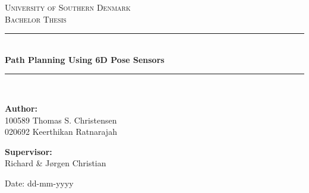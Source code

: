 \begin{titlepage}
\begin{center}

\textsc{\LARGE University of Southern Denmark}\\[1.5cm]
\textsc{\Large Bachelor Thesis}\\[0.5cm]
\vfill
\hrule ~\\[0.3cm]
{ \huge \bfseries Path Planning Using 6D Pose Sensors\\[0.4cm] }
\hrule ~\\[1.5cm]
\vfill

\begin{minipage}[t]{7.9cm}
\begin{flushleft} \large
\textbf{Author:}\\
100589 Thomas S. Christensen \\
020692 Keerthikan Ratnarajah\\
\end{flushleft}
\end{minipage}
\begin{minipage}[t]{7.9cm}
\begin{flushright} \large
\textbf{Supervisor:} \\
Richard \& Jørgen Christian
\end{flushright}
\end{minipage}

\vspace{1.2cm}
Date: dd-mm-yyyy

\end{center}
\end{titlepage}